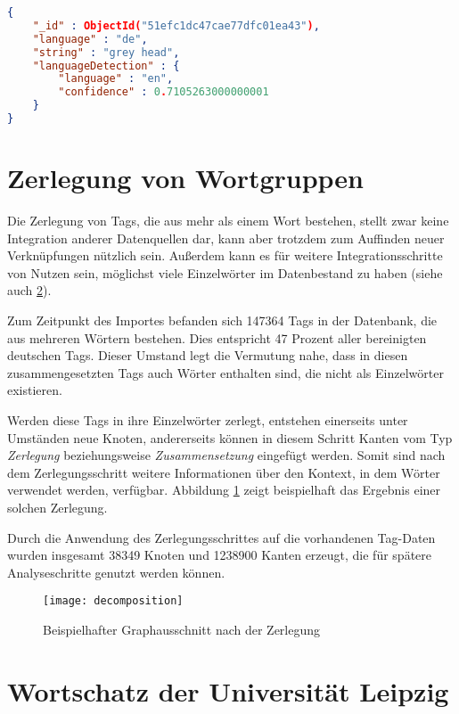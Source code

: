 \begin{lstlisting}[language=json, label={lst:google_node}, caption={Knoten mit Spracherkennungsdaten}]
{
    "_id" : ObjectId("51efc1dc47cae77dfc01ea43"),
    "language" : "de",
    "string" : "grey head",
    "languageDetection" : {
        "language" : "en",
        "confidence" : 0.7105263000000001
    }
}
\end{lstlisting}

\section{Zerlegung von Wortgruppen}
\label{decomposition}

Die Zerlegung von Tags, die aus mehr als einem Wort bestehen, stellt zwar keine Integration anderer Datenquellen dar, kann aber trotzdem zum Auffinden neuer Verknüpfungen nützlich sein. Außerdem kann es für weitere Integrationsschritte von Nutzen sein, möglichst viele Einzelwörter im Datenbestand zu haben (siehe auch \ref{wortschatz}).

Zum Zeitpunkt des Importes befanden sich \num{147364} Tags in der Datenbank, die aus mehreren Wörtern bestehen. Dies entspricht \num{47} Prozent aller bereinigten deutschen Tags. Dieser Umstand legt die Vermutung nahe, dass in diesen zusammengesetzten Tags auch Wörter enthalten sind, die nicht als Einzelwörter existieren.

Werden diese Tags in ihre Einzelwörter zerlegt, entstehen einerseits unter Umständen neue Knoten, andererseits können in diesem Schritt Kanten vom Typ \emph{Zerlegung} beziehungsweise \emph{Zusammensetzung} eingefügt werden. Somit sind nach dem Zerlegungsschritt weitere Informationen über den Kontext, in dem Wörter verwendet werden, verfügbar. Abbildung \ref{fig:decomposition} zeigt beispielhaft das Ergebnis einer solchen Zerlegung.

Durch die Anwendung des Zerlegungsschrittes auf die vorhandenen Tag-Daten wurden insgesamt \num{38349} Knoten und \num{1238900} Kanten erzeugt, die für spätere Analyseschritte genutzt werden können.

\begin{figure}
\centering
\texttt{[image: decomposition]}
\caption{Beispielhafter Graphausschnitt nach der Zerlegung}
\label{fig:decomposition}
\end{figure}

\section{Wortschatz der Universität Leipzig}
\label{wortschatz}

